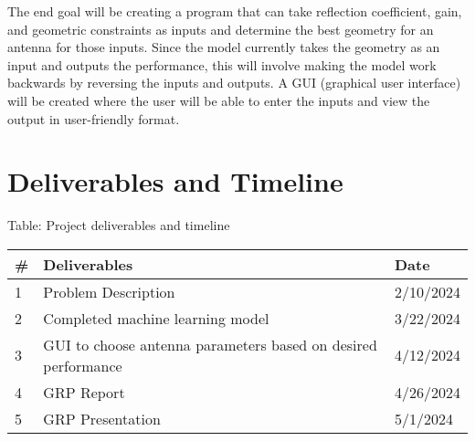 \documentclass[12pt, letterpaper, notitlepage]{article}
\begin{document}
The end goal will be creating a program that can take reflection coefficient, gain, and geometric constraints as inputs and determine the best geometry for an antenna for those inputs. Since the model currently takes the geometry as an input and outputs the performance, this will involve making the model work backwards by reversing the inputs and outputs. A GUI (graphical user interface) will be created where the user will be able to enter the inputs and view the output in user-friendly format. 

\section*{Deliverables and Timeline}
\begin{center}
\centering
Table: Project deliverables and timeline\\
\noindent\begin{tabular}{|l|l|l|} \hline
  \rowcolor{lightgray}\textbf{\#} & \textbf{Deliverables} & \textbf{Date} \\ \hline
  1 & Problem Description & 2/10/2024\\ \hline
  2 & Completed machine learning model & 3/22/2024\\ \hline
  3 & GUI to choose antenna parameters based on desired performance & 4/12/2024\\ \hline
  4 & GRP Report & 4/26/2024\\ \hline
  5 & GRP Presentation & 5/1/2024\\ \hline
\end{tabular}
\end{center}
\hspace{1em}



\end{document}

